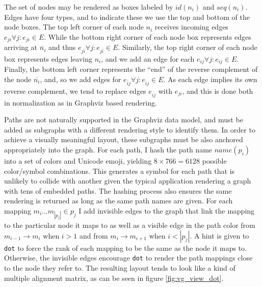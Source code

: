 \documentclass[a4paper,12pt,numbered,oneside]{Classes/PhDThesisPSnPDF}
\begin{document}
The set of nodes may be rendered as boxes labeled by $id(n_i)$ and $seq(n_i)$.
Edges have four types, and to indicate these we use the top and bottom of the node boxes.
The top left corner of each node $n_i$ receives incoming edges $e_{ji} \forall j : e_{ji} \in E$.
While the bottom right corner of each node box represents edges arriving at $\overline{n_i}$ and thus $e_{j\overline{i}} \forall j : e_{j\overline{i}} \in E$.
Similarly, the top right corner of each node box represents edges leaving $n_i$, and we add an edge for each $e_{ij} \forall j : e_{ij} \in E$.
Finally, the bottom left corner represents the ``end'' of the reverse complement of the node $\overline{n_i}$, and, so we add edges for $e_{\overline{i}j} \forall j : e_{\overline{i}j} \in E$.
As each edge implies its own reverse complement, we tend to replace edges $e_{\overline{ij}}$ with $e_{ji}$, and this is done both in normalization as in Graphviz based rendering.

Paths are not naturally supported in the Graphviz data model, and must be added as subgraphs with a different rendering style to identify them.
In order to achieve a visually meaningful layout, these subgraphs must be also anchored appropriately into the graph.
For each path, I hash the path name $name(p_i)$ into a set of colors and Unicode emoji, yielding $8 \times 766 = 6128$ possible color/symbol combinations.
This generates a symbol for each path that is unlikely to collide with another given the typical application rendering a graph with tens of embedded paths.
The hashing process also ensures the same rendering is returned as long as the same path names are given.
For each mapping $m_i\ldots m_{|p_j|} \in p_j$ I add invisible edges to the graph that link the mapping to the particular node it maps to as well as a visible edge in the path color from $m_{i-1} \to m_i$ when $i > 1$ and from $m_i \to m_{i+1}$ when $i < |p_j|$.
A hint is given to {\tt dot} to force the rank of each mapping to be the same as the node it maps to.
Otherwise, the invisible edges encourage {\tt dot} to render the path mappings close to the node they refer to.
The resulting layout tends to look like a kind of multiple alignment matrix, as can be seen in figure \ref{fig:vg_view_dot}.
\end{document}
